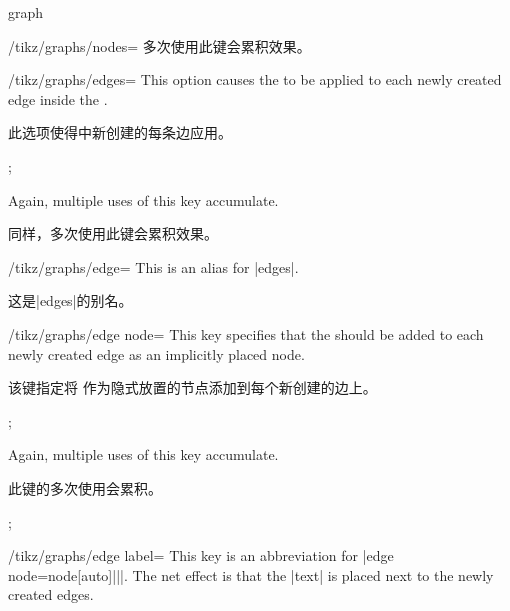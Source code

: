 \begin{pathoperation}{graph}{}
\begin{key}{/tikz/graphs/nodes=}
        多次使用此键会累积效果。
    \end{key}
    \begin{key}{/tikz/graphs/edges=}
        This option causes the  to be applied to each newly
        created edge inside the .
        
        此选项使得中新创建的每条边应用。

%
\begin{codeexample}[preamble={\usetikzlibrary{graphs}}]
\tikz {};
\end{codeexample}
        Again, multiple uses of this key accumulate.

        同样，多次使用此键会累积效果。


    \end{key}
    \begin{key}{/tikz/graphs/edge=}
        This is an alias for |edges|.

        这是|edges|的别名。
    \end{key}

    \begin{key}{/tikz/graphs/edge node=}
        This key specifies that the  should be added
        to each newly created edge as an implicitly placed node.
        
        该键指定将  作为隐式放置的节点添加到每个新创建的边上。

%
\begin{codeexample}[preamble={\usetikzlibrary{graphs}}]
\tikz {};
\end{codeexample}
        Again, multiple uses of this key accumulate.
        
        此键的多次使用会累积。
%
\begin{codeexample}[preamble={\usetikzlibrary{graphs}}]
\tikz {};
\end{codeexample}
    \end{key}

    \begin{key}{/tikz/graphs/edge label=}
        This key is an abbreviation for |edge node=node[auto]{||}|.
        The net effect is that the |text| is placed next to the newly created
        edges.
        

\end{key}
\end{pathoperation}
